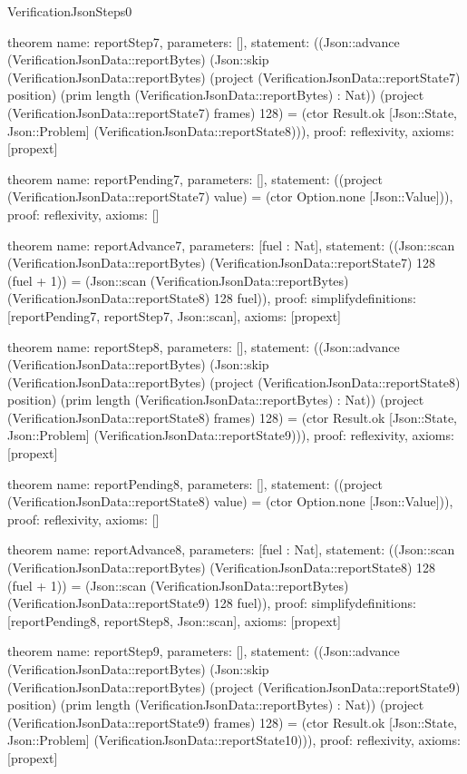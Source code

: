 \begin{lexlean}{VerificationJsonSteps0}
\begin{semanticmodule}
theorem{
  name: reportStep7,
  parameters: [],
  statement: ((Json::advance (VerificationJsonData::reportBytes) (Json::skip (VerificationJsonData::reportBytes) (project (VerificationJsonData::reportState7) position) (prim length (VerificationJsonData::reportBytes) : Nat)) (project (VerificationJsonData::reportState7) frames) 128) = (ctor Result.ok [Json::State, Json::Problem] (VerificationJsonData::reportState8))),
  proof: reflexivity{},
  axioms: [propext]
}

theorem{
  name: reportPending7,
  parameters: [],
  statement: ((project (VerificationJsonData::reportState7) value) = (ctor Option.none [Json::Value])),
  proof: reflexivity{},
  axioms: []
}

theorem{
  name: reportAdvance7,
  parameters: [fuel : Nat],
  statement: ((Json::scan (VerificationJsonData::reportBytes) (VerificationJsonData::reportState7) 128 (fuel + 1)) = (Json::scan (VerificationJsonData::reportBytes) (VerificationJsonData::reportState8) 128 fuel)),
  proof: simplify{definitions: [reportPending7, reportStep7, Json::scan]},
  axioms: [propext]
}

theorem{
  name: reportStep8,
  parameters: [],
  statement: ((Json::advance (VerificationJsonData::reportBytes) (Json::skip (VerificationJsonData::reportBytes) (project (VerificationJsonData::reportState8) position) (prim length (VerificationJsonData::reportBytes) : Nat)) (project (VerificationJsonData::reportState8) frames) 128) = (ctor Result.ok [Json::State, Json::Problem] (VerificationJsonData::reportState9))),
  proof: reflexivity{},
  axioms: [propext]
}

theorem{
  name: reportPending8,
  parameters: [],
  statement: ((project (VerificationJsonData::reportState8) value) = (ctor Option.none [Json::Value])),
  proof: reflexivity{},
  axioms: []
}

theorem{
  name: reportAdvance8,
  parameters: [fuel : Nat],
  statement: ((Json::scan (VerificationJsonData::reportBytes) (VerificationJsonData::reportState8) 128 (fuel + 1)) = (Json::scan (VerificationJsonData::reportBytes) (VerificationJsonData::reportState9) 128 fuel)),
  proof: simplify{definitions: [reportPending8, reportStep8, Json::scan]},
  axioms: [propext]
}

theorem{
  name: reportStep9,
  parameters: [],
  statement: ((Json::advance (VerificationJsonData::reportBytes) (Json::skip (VerificationJsonData::reportBytes) (project (VerificationJsonData::reportState9) position) (prim length (VerificationJsonData::reportBytes) : Nat)) (project (VerificationJsonData::reportState9) frames) 128) = (ctor Result.ok [Json::State, Json::Problem] (VerificationJsonData::reportState10))),
  proof: reflexivity{},
  axioms: [propext]
}


\end{semanticmodule}
\end{lexlean}
